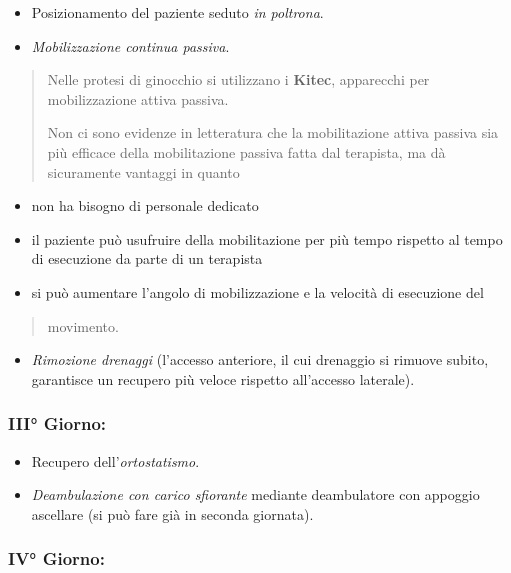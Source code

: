 \documentclass[]{article}
\begin{document}
\begin{itemize}
\item
  Posizionamento del paziente seduto \emph{in poltrona}.
\item
  \emph{Mobilizzazione continua passiva}.
\end{itemize}

\begin{quote}
Nelle protesi di ginocchio si utilizzano i \textbf{Kitec}, apparecchi
per mobilizzazione attiva passiva.

Non ci sono evidenze in letteratura che la mobilitazione attiva passiva
sia più efficace della mobilitazione passiva fatta dal terapista, ma dà
sicuramente vantaggi in quanto
\end{quote}

\begin{itemize}
\item
  non ha bisogno di personale dedicato
\item
  il paziente può usufruire della mobilitazione per più tempo rispetto
  al tempo di esecuzione da parte di un terapista
\item
  si può aumentare l'angolo di mobilizzazione e la velocità di
  esecuzione del
\end{itemize}

\begin{quote}
movimento.
\end{quote}

\begin{itemize}
\item
  \emph{Rimozione drenaggi} (l'accesso anteriore, il cui drenaggio si
  rimuove subito, garantisce un recupero più veloce rispetto all'accesso
  laterale).
\end{itemize}

\subsubsection{III° Giorno:}\label{iii-giorno}

\begin{itemize}
\item
  Recupero dell'\emph{ortostatismo}.
\item
  \emph{Deambulazione con carico sfiorante} mediante deambulatore con
  appoggio ascellare (si può fare già in seconda giornata).
\end{itemize}

\subsubsection{IV° Giorno:}\label{iv-giorno}
\end{document}
